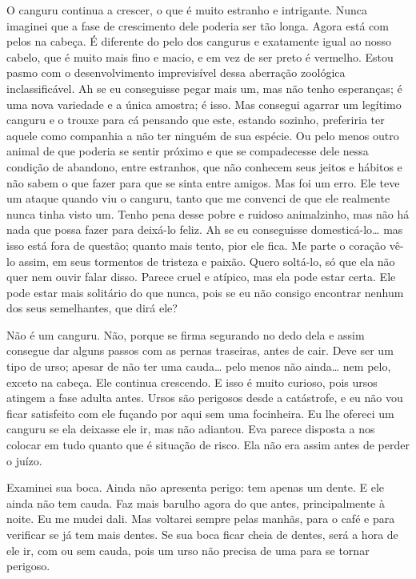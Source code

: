   O canguru continua a crescer, o que é muito estranho e
intrigante. Nunca imaginei que a fase de crescimento dele poderia ser tão longa.
Agora está com pelos na cabeça. É diferente do pelo dos cangurus e exatamente
igual ao nosso cabelo, que é muito mais fino e macio, e em vez de ser preto é
vermelho. Estou pasmo com o desenvolvimento imprevisível dessa
aberração zoológica inclassificável. Ah se eu conseguisse pegar mais um, mas
não tenho esperanças; é uma nova variedade e a única amostra; é isso. Mas
consegui agarrar um legítimo canguru e o trouxe para cá pensando que este,
estando sozinho, preferiria ter aquele como companhia a não ter ninguém de sua
espécie. Ou pelo menos outro animal de que poderia se sentir próximo e que se
compadecesse dele nessa condição de abandono, entre estranhos, que não conhecem
seus jeitos e hábitos e não sabem o que fazer para que se sinta entre amigos.
Mas foi um erro. Ele teve um ataque quando viu o canguru, tanto que me
convenci de que ele realmente nunca tinha visto um. Tenho pena desse pobre e
ruidoso animalzinho, mas não há nada que possa fazer para deixá-lo feliz. Ah se
eu conseguisse domesticá-lo\ldots{} mas isso está fora de questão; quanto mais tento,
pior ele fica. Me parte o coração vê-lo assim, em seus tormentos de tristeza e
paixão. Quero soltá-lo, só que ela não quer nem ouvir falar disso. Parece cruel e
atípico, mas ela pode estar certa. Ele pode estar mais solitário do
que nunca, pois se eu não consigo encontrar nenhum dos seus semelhantes, que dirá ele?

   Não é um canguru. Não, porque se firma segurando
no dedo dela  e assim consegue dar alguns passos com as pernas traseiras, antes
de cair. Deve ser um tipo de urso; apesar de não ter uma cauda\ldots{} pelo menos não
ainda\ldots{} nem pelo, exceto na cabeça. Ele continua crescendo. E isso é muito curioso, 
pois ursos atingem a fase adulta antes.
Ursos são perigosos desde a catástrofe, e eu não vou ficar satisfeito com
ele fuçando por aqui sem uma focinheira. Eu lhe ofereci um canguru se ela
deixasse ele ir, mas não adiantou. Eva parece disposta a nos colocar em
tudo quanto que é situação de risco. Ela não era assim antes de perder o juízo.

   Examinei sua boca. Ainda não apresenta perigo: tem apenas
um dente. E ele ainda não tem cauda. Faz mais barulho agora do que antes,
principalmente à noite. Eu me mudei dali. Mas voltarei sempre pelas manhãs, para o
café e para verificar se já tem mais dentes. Se sua boca ficar
cheia de dentes, será a hora de ele ir, com ou sem cauda, pois um urso não
precisa de uma para se tornar perigoso.

